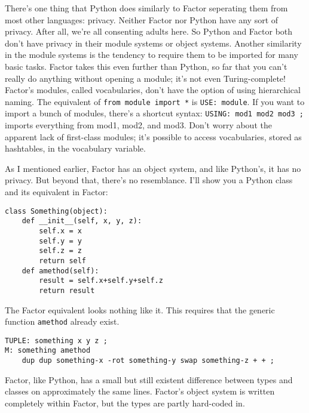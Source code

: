 \documentclass{article}
\begin{document}
There's one thing that Python does similarly to Factor seperating them from most other languages: privacy. Neither Factor nor Python have any sort of privacy. After all, we're all consenting adults here. So Python and Factor both don't have privacy in their module systems or object systems. Another similarity in the module systems is the tendency to require them to be imported for many basic tasks. Factor takes this even further than Python, so far that you can't really do anything without opening a module; it's not even Turing-complete! Factor's modules, called vocabularies, don't have the option of using hierarchical naming. The equivalent of \verb|from module import *| is \verb|USE: module|. If you want to import a bunch of modules, there's a shortcut syntax: \verb|USING: mod1 mod2 mod3 ;| imports everything from mod1, mod2, and mod3. Don't worry about the apparent lack of first-class modules; it's possible to access vocabularies, stored as hashtables, in the vocabulary variable.

As I mentioned earlier, Factor has an object system, and like Python's, it has no privacy. But beyond that, there's no resemblance. I'll show you a Python class and its equivalent in Factor:
\begin{verbatim}
class Something(object):
    def __init__(self, x, y, z):
        self.x = x
        self.y = y
        self.z = z
        return self
    def amethod(self):
        result = self.x+self.y+self.z
        return result
\end{verbatim}
The Factor equivalent looks nothing like it. This requires that the generic function \texttt{amethod} already exist.
\begin{verbatim}
TUPLE: something x y z ;
M: something amethod
    dup dup something-x -rot something-y swap something-z + + ;
\end{verbatim}
Factor, like Python, has a small but still existent difference between types and classes on approximately the same lines. Factor's object system is written completely within Factor, but the types are partly hard-coded in.
\end{document}
